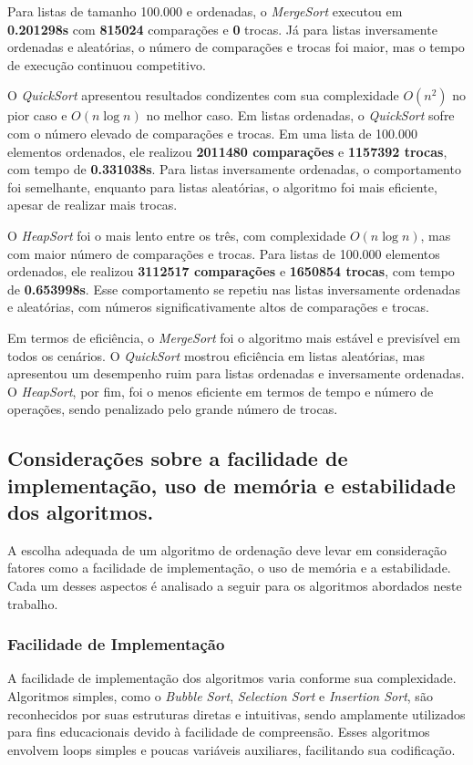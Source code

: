 \documentclass[a4paper,12pt]{article}
\begin{document}
Para listas de tamanho 100.000 e ordenadas, o \textit{MergeSort} executou em \textbf{0.201298s} com \textbf{815024} comparações e \textbf{0} trocas. Já para listas inversamente ordenadas e aleatórias, o número de comparações e trocas foi maior, mas o tempo de execução continuou competitivo.

O \textit{QuickSort} apresentou resultados condizentes com sua complexidade \( O(n^2) \) no pior caso e \( O(n \log n) \) no melhor caso. Em listas ordenadas, o \textit{QuickSort} sofre com o número elevado de comparações e trocas. Em uma lista de 100.000 elementos ordenados, ele realizou \textbf{2011480 comparações} e \textbf{1157392 trocas}, com tempo de \textbf{0.331038s}. Para listas inversamente ordenadas, o comportamento foi semelhante, enquanto para listas aleatórias, o algoritmo foi mais eficiente, apesar de realizar mais trocas.

O \textit{HeapSort} foi o mais lento entre os três, com complexidade \( O(n \log n) \), mas com maior número de comparações e trocas. Para listas de 100.000 elementos ordenados, ele realizou \textbf{3112517 comparações} e \textbf{1650854 trocas}, com tempo de \textbf{0.653998s}. Esse comportamento se repetiu nas listas inversamente ordenadas e aleatórias, com números significativamente altos de comparações e trocas.

Em termos de eficiência, o \textit{MergeSort} foi o algoritmo mais estável e previsível em todos os cenários. O \textit{QuickSort} mostrou eficiência em listas aleatórias, mas apresentou um desempenho ruim para listas ordenadas e inversamente ordenadas. O \textit{HeapSort}, por fim, foi o menos eficiente em termos de tempo e número de operações, sendo penalizado pelo grande número de trocas.

\subsection{Considerações sobre a facilidade de implementação, uso de memória e estabilidade dos algoritmos.}

A escolha adequada de um algoritmo de ordenação deve levar em consideração fatores como a facilidade de implementação, o uso de memória e a estabilidade. Cada um desses aspectos é analisado a seguir para os algoritmos abordados neste trabalho.

\subsubsection{Facilidade de Implementação}
A facilidade de implementação dos algoritmos varia conforme sua complexidade. Algoritmos simples, como o \textit{Bubble Sort}, \textit{Selection Sort} e \textit{Insertion Sort}, são reconhecidos por suas estruturas diretas e intuitivas, sendo amplamente utilizados para fins educacionais devido à facilidade de compreensão. Esses algoritmos envolvem loops simples e poucas variáveis auxiliares, facilitando sua codificação.
\end{document}
